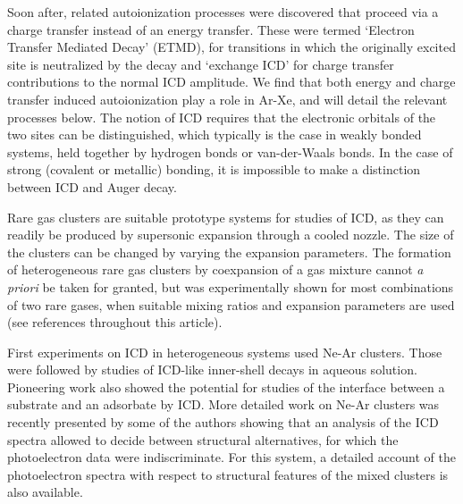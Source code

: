 Soon after, related 
autoionization processes were discovered that proceed via a 
charge transfer instead of an energy transfer. 
These were termed `Electron Transfer Mediated Decay' 
 (ETMD),\cite{zobeley,mueller,sakai,foerstel} for transitions in 
 which the originally excited site is neutralized by the decay 
and `exchange ICD' for charge transfer contributions to the 
normal ICD amplitude.\cite{santrarev,jahnkesat}
We find that both energy and charge transfer induced 
autoionization play a role in Ar-Xe, and will detail the 
relevant processes below. The notion of ICD requires that the 
electronic orbitals of the two sites can be distinguished, which 
typically is the case in weakly bonded systems, held together by 
hydrogen bonds or van-der-Waals bonds. In the case of strong
(covalent or metallic) bonding, it is impossible to make a
distinction between ICD and Auger decay.\cite{hergenhahn_review}

Rare gas clusters are suitable prototype systems for studies of
ICD, as they can readily be produced by supersonic 
expansion through a cooled nozzle. 
The size of the clusters can be changed by varying the expansion parameters.
The formation of heterogeneous rare gas clusters by coexpansion of a gas mixture cannot {\it a priori} be taken for granted, but was experimentally shown for most combinations of two rare gases, when suitable mixing ratios and expansion parameters are used (see references throughout this article).

First experiments on ICD in heterogeneous systems used Ne-Ar 
clusters.\cite{barthnear} Those were followed by studies of 
ICD-like inner-shell decays in aqueous solution.\cite{aziz,pokapanich,pokapanich2011}
Pioneering work also showed the 
potential for studies of the interface between a substrate and an 
adsorbate by ICD.\cite{grieves} More detailed work on Ne-Ar 
clusters was recently presented by some of the authors \cite{fasshauer2014}
showing that an analysis of the ICD spectra
allowed to decide between structural alternatives, for which the
photoelectron data were indiscriminate.
For this system, a detailed account of the
photoelectron spectra with respect to structural features of the 
mixed clusters is also available.\cite{lundwall}

